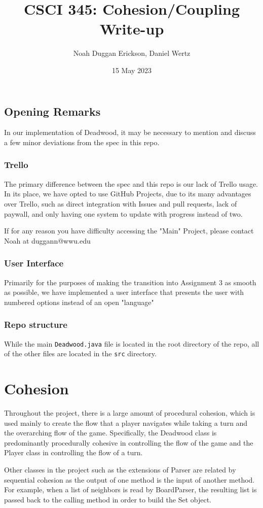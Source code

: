 \documentclass[letterpaper, twoside]{report}
\title{CSCI 345: Cohesion/Coupling Write-up}
\author{Noah Duggan Erickson, Daniel Wertz}
\date{15 May 2023}
\begin{document}
\maketitle
\section{Opening Remarks}
In our implementation of Deadwood, it may be necessary to mention and discuss a few minor deviations from the spec in this repo.
\subsection{Trello}
The primary difference between the spec and this repo is our lack of Trello usage. In its place, we have opted to use GitHub Projects, due to its many advantages over Trello, such as direct integration with Issues and pull requests, lack of paywall, and only having one system to update with progress instead of two.

If for any reason you have difficulty accessing the "Main" Project, please contact Noah at duggann@wwu.edu
\subsection{User Interface}
Primarily for the purposes of making the transition into Assignment 3 as smooth as possible, we have implemented a user interface that presents the user with numbered options instead of an open "language"
\subsection{Repo structure}
While the main \texttt{Deadwood.java} file is located in the root directory of the repo, all of the other files are located in the \texttt{src} directory.

\chapter{Cohesion}

Throughout the project, there is a large amount of procedural cohesion, which is used mainly to create the flow that a player navigates while taking a turn and the overarching flow of the game. Specifically, the Deadwood class is predominantly procedurally cohesive in controlling the flow of the game and the Player class in controlling the flow of a turn.

Other classes in the project such as the extensions of Parser are related by sequential cohesion as the output of one method is the input of another method. For example, when a list of neighbors is read by BoardParser, the resulting list is passed back to the calling method in order to build the Set object.
\end{document}
